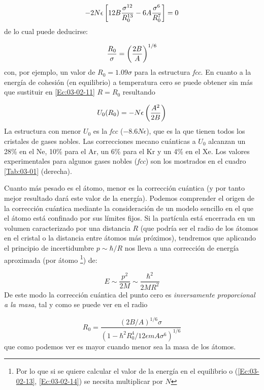 \begin{equation}
	-2N\epsilon \left[  12 B \frac{\sigma^{12}}{R_0^{13}} - 6 A \frac{\sigma^6}{R_0^7} \right] = 0 \label{Ec:03-02-12}
\end{equation}	
de lo cual puede deducirse:

\begin{equation}
	\frac{R_0}{\sigma} =  \left( \frac{2B}{A} \right)^{1/6} \label{Ec:03-02-13}
\end{equation}
con, por ejemplo, un valor de $R_0=1.09\sigma$ para la estructura \textit{fcc}. En cuanto a la energía de cohesión (en equilibrio) a temperatura cero se puede obtener sin más que sustituir en \ref{Ec:03-02-11} $R=R_0$ resultando

\begin{equation}
	U_0 (R_0) = - N\epsilon \left( \frac{A^2}{2B} \right) \label{Ec:03-02-14}
\end{equation}
La estructura con menor $U_0$ es la \textit{fcc} ($-8.6 N\epsilon$), que es la que tienen todos los cristales de gases nobles. Las correcciones mecano cuánticas a $U_0$ alcanzan un 28\% en el Ne, 10\% para el Ar, un 6\% para el Kr y un  4\% en el Xe. Los valores experimentales para algunos gases nobles (\textit{fcc}) son los mostrados en el cuadro \ref{Tab:03-01} (derecha).

Cuanto más pesado es el átomo, menor es la corrección cuántica (y por tanto mejor resultado dará este valor de la energía). Podemos comprender el origen de la corrección cuántica mediante la consideración de un modelo sencillo en el que el átomo está confinado por sus límites fijos. Si la partícula está encerrada en un volumen caracterizado por una distancia $R$ (que podría ser el radio de los átomos en el cristal o la distancia entre átomos más próximos), tendremos que aplicando el principio de incertidumbre $p\sim \hbar /R$ nos lleva a una corrección de energía aproximada (por átomo \footnote{Por lo que si se quiere calcular el valor de la energía en el equilibrio o (\ref{Ec:03-02-13}, \ref{Ec:03-02-14}) se necsita multiplicar por $N$}) de:

\begin{equation*}
	E \sim \frac{p^2}{2M} \sim \frac{\hbar^2}{2M R^2} 
\end{equation*} 
De este modo la corrección cuántica del punto cero es \textit{inversamente proporcional a la masa}, tal y como se puede ver en el radio

\begin{equation}
	R_0 = \frac{(2B/A)^{1/6} \sigma}{(1-\hbar^2 R_0^4 / 12\epsilon m A \sigma^6)^{1/6}}
\end{equation}
que como podemos ver es mayor cuando menor sea la masa de los átomos. 

